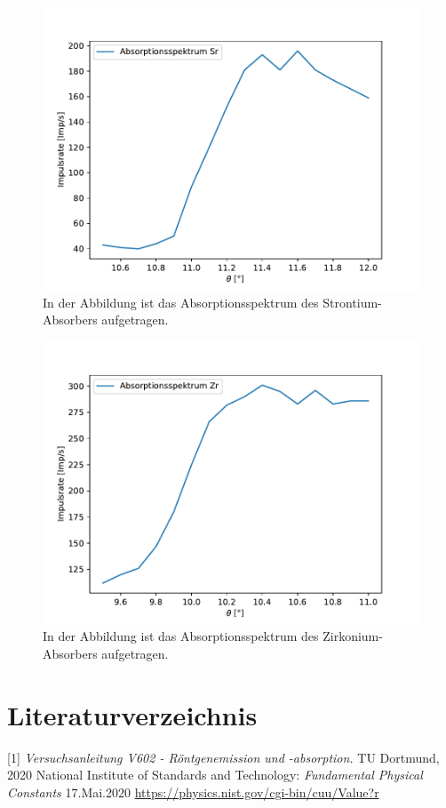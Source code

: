 \documentclass[titlepage = firstcover]{scrartcl}
\begin{document}
            \begin{figure}[h]
              \centering
              \includegraphics{Strontium.pdf}
              \caption{In der Abbildung ist das Absorptionsspektrum des Strontium-Absorbers aufgetragen.}
              \label{fig:Strontium}
            \end{figure}

            \begin{figure}[h]
              \centering
              \includegraphics{Zirkonium.pdf}
              \caption{In der Abbildung ist das Absorptionsspektrum des Zirkonium-Absorbers aufgetragen.}
              \label{fig:Zirkonium}
            \end{figure}
            \FloatBarrier

           
            \newpage
            \section{Literaturverzeichnis}
                    [1] \textit{Versuchsanleitung V602 - Röntgenemission und -absorption.} TU Dortmund, 2020 \newline
                    [2] National Institute of Standards and Technology: \textit{Fundamental Physical Constants} 17.Mai.2020
                        \url{https://physics.nist.gov/cgi-bin/cuu/Value?r}
        
            \newpage
\end{document}

